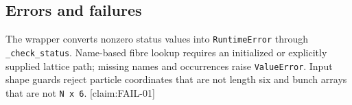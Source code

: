 \subsection{Errors and failures}

The wrapper converts nonzero status values into \texttt{RuntimeError} through \texttt{\_check\_status}. Name-based fibre lookup requires an initialized or explicitly supplied lattice path; missing names and occurrences raise \texttt{ValueError}. Input shape guards reject particle coordinates that are not length six and bunch arrays that are not \texttt{N x 6}. [claim:FAIL-01]
